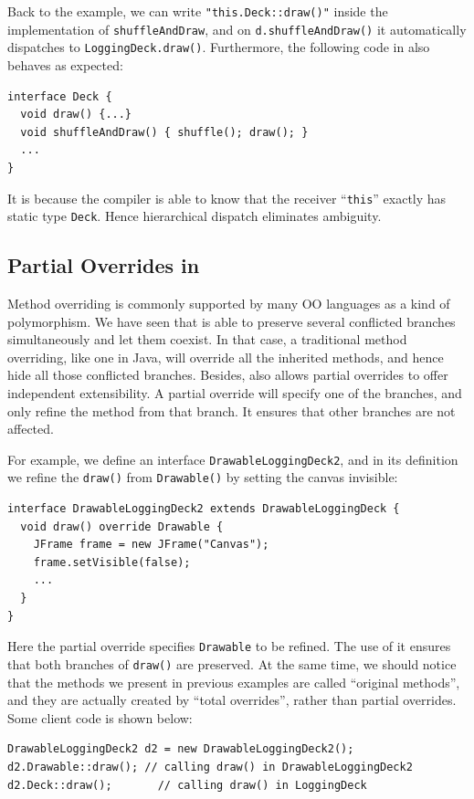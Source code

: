 Back to the example, we can write \lstinline|"this.Deck::draw()"| inside the implementation of \lstinline|shuffleAndDraw|, and on \lstinline|d.shuffleAndDraw()| it automatically dispatches to \lstinline|LoggingDeck.draw()|. Furthermore, the following code in \name{}
also behaves as expected:
\vspace{3pt}\begin{lstlisting}
interface Deck {
  void draw() {...}
  void shuffleAndDraw() { shuffle(); draw(); }
  ...
}
\end{lstlisting}\vspace{3pt}
It is because the compiler is able to know that the receiver ``\lstinline|this|'' exactly has static type \lstinline|Deck|. Hence hierarchical dispatch eliminates ambiguity.

\subsection{Partial Overrides in \MIM	}\label{subsec:partialoverrides}

Method overriding is commonly supported by many OO languages as a kind of polymorphism.
We have seen that \MIM{} is able to preserve several conflicted branches simultaneously and let them coexist.
In that case, a traditional method overriding, like one in Java, will override all the inherited methods, and hence
hide all those conflicted branches. Besides, \MIM{} also allows partial overrides to offer independent extensibility.
A partial override will specify one of the branches, and only refine the method from that branch. It ensures that
other branches are not affected.

For example, we define an interface \lstinline|DrawableLoggingDeck2|, and in its definition we refine the \lstinline|draw()| from \lstinline|Drawable()| by setting
the canvas invisible:
\vspace{3pt}\begin{lstlisting}
interface DrawableLoggingDeck2 extends DrawableLoggingDeck {
  void draw() override Drawable {
    JFrame frame = new JFrame("Canvas");
    frame.setVisible(false);
    ...
  }
}
\end{lstlisting}\vspace{3pt}
Here the partial override specifies \lstinline|Drawable| to be refined. The use of it ensures that both branches of \lstinline|draw()| are preserved. At the same time, we should notice that the methods we present in previous examples are called ``original methods'', and they are actually created by ``total overrides'', rather than partial overrides. Some client code is shown below: 
\vspace{3pt}\begin{lstlisting}
DrawableLoggingDeck2 d2 = new DrawableLoggingDeck2();
d2.Drawable::draw(); // calling draw() in DrawableLoggingDeck2
d2.Deck::draw();       // calling draw() in LoggingDeck
\end{lstlisting}\vspace{3pt}

